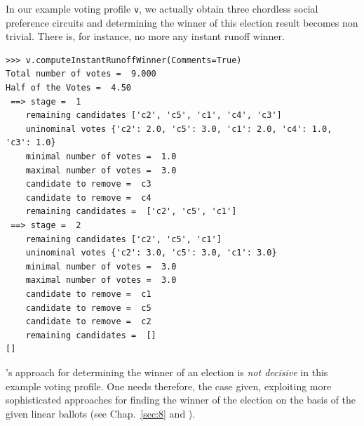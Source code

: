 In our example voting profile \texttt{v}, we actually obtain three chordless social preference circuits and determining the winner of this election result becomes non trivial. There is, for instance, no more any instant runoff winner.
\begin{lstlisting}
>>> v.computeInstantRunoffWinner(Comments=True)
Total number of votes =  9.000
Half of the Votes =  4.50
 ==> stage =  1
    remaining candidates ['c2', 'c5', 'c1', 'c4', 'c3']
    uninominal votes {'c2': 2.0, 'c5': 3.0, 'c1': 2.0, 'c4': 1.0, 'c3': 1.0}
    minimal number of votes =  1.0
    maximal number of votes =  3.0
    candidate to remove =  c3
    candidate to remove =  c4
    remaining candidates =  ['c2', 'c5', 'c1']
 ==> stage =  2
    remaining candidates ['c2', 'c5', 'c1']
    uninominal votes {'c2': 3.0, 'c5': 3.0, 'c1': 3.0}
    minimal number of votes =  3.0
    maximal number of votes =  3.0
    candidate to remove =  c1
    candidate to remove =  c5
    candidate to remove =  c2
    remaining candidates =  []
[]
\end{lstlisting}

\Condorcet 's approach for determining the winner of an election is \emph{not decisive} in this example voting profile. One needs therefore, the case given, exploiting more sophisticated approaches for finding the winner of the election on the basis of the given linear ballots (see Chap.~\ref{sec:8} and \citealp{BIS-2008a}). 

